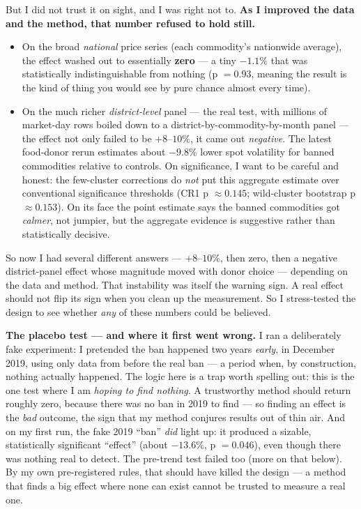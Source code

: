 \documentclass[11pt]{article}
\begin{document}
But I did not trust it on sight, and I was right not to. \textbf{As I improved the data and the method, that number refused to hold still.}

\begin{itemize}[leftmargin=1.4em]
  \item On the broad \emph{national} price series (each commodity's nationwide average), the effect washed out to essentially \textbf{zero} --- a tiny $-1.1\%$ that was statistically indistinguishable from nothing (p $=0.93$, meaning the result is the kind of thing you would see by pure chance almost every time).
  \item On the much richer \emph{district-level} panel --- the real test, with millions of market-day rows boiled down to a district-by-commodity-by-month panel --- the effect not only failed to be $+8$--$10\%$, it came out \emph{negative}. The latest food-donor rerun estimates about \textbf{$-9.8\%$} lower spot volatility for banned commodities relative to controls. On significance, I want to be careful and honest: the few-cluster corrections do \emph{not} put this aggregate estimate over conventional significance thresholds (CR1 p $\approx 0.145$; wild-cluster bootstrap p $\approx 0.153$). On its face the point estimate says the banned commodities got \emph{calmer}, not jumpier, but the aggregate evidence is suggestive rather than statistically decisive.
\end{itemize}

So now I had several different answers --- $+8$--$10\%$, then zero, then a negative district-panel effect whose magnitude moved with donor choice --- depending on the data and method. That instability was itself the warning sign. A real effect should not flip its sign when you clean up the measurement. So I stress-tested the design to see whether \emph{any} of these numbers could be believed.

\textbf{The placebo test --- and where it first went wrong.} I ran a deliberately fake experiment: I pretended the ban happened two years \emph{early}, in December 2019, using only data from before the real ban --- a period when, by construction, nothing actually happened. The logic here is a trap worth spelling out: this is the one test where I am \emph{hoping to find nothing}. A trustworthy method should return roughly zero, because there was no ban in 2019 to find --- so finding an effect is the \emph{bad} outcome, the sign that my method conjures results out of thin air. And on my first run, the fake 2019 ``ban'' \emph{did} light up: it produced a sizable, statistically significant ``effect'' (about $-13.6\%$, p $=0.046$), even though there was nothing real to detect. The pre-trend test failed too (more on that below). By my own pre-registered rules, that should have killed the design --- a method that finds a big effect where none can exist cannot be trusted to measure a real one.
\end{document}
